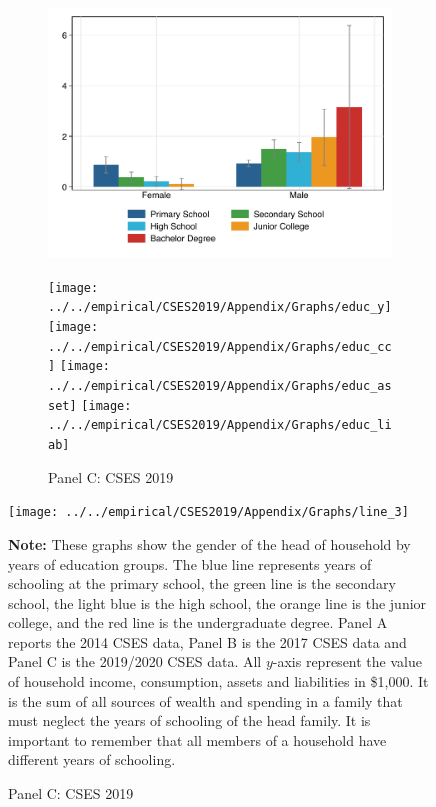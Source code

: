 \documentclass[11pt,letterpaper]{article}
\begin{document}
\begin{figure}[H]
\begin{subfigure}[b]{0.33\linewidth}
		\includegraphics[width=1\linewidth]{../../empirical/CSES2017/Appendix/Graphs/educ_liab} 
		\vspace{-2.5em}
		\newline {}
	\end{subfigure}
	\hfil
	\begin{subfigure}[b]{0.33\linewidth}
		\caption*{Panel C: CSES 2019} \vspace{-.5em}
		\label{fig:3c}
		\texttt{[image: ../../empirical/CSES2019/Appendix/Graphs/educ\_y]}
		\vspace{-2.5em}
		\newline {} 
		\texttt{[image: ../../empirical/CSES2019/Appendix/Graphs/educ\_cc]}
		\vspace{-2.5em}
		\newline {} 
		\texttt{[image: ../../empirical/CSES2019/Appendix/Graphs/educ\_asset]} 
		\vspace{-2.5em}
		\newline {}
		\texttt{[image: ../../empirical/CSES2019/Appendix/Graphs/educ\_liab]} 
		\vspace{-2.5em}
		\newline {}
	\end{subfigure}
		\texttt{[image: ../../empirical/CSES2019/Appendix/Graphs/line\_3]} 
	\begin{tablenotes}
		\footnotesize
		\item \textbf{Note:} These graphs show the gender of the head of household by years of education groups. The blue line represents years of schooling at the primary school, the green line is the secondary school, the light blue is the high school, the orange line is the junior college, and the red line is the undergraduate degree. Panel A reports the 2014 CSES data, Panel B is the 2017 CSES data and Panel C is the 2019/2020 CSES data. All $y$-axis represent the value of household income, consumption, assets and liabilities in \$1,000. It is the sum of all sources of wealth and spending in a family that must neglect the years of schooling of the head family. It is important to remember that all members of a household have different years of schooling. 

\end{tablenotes}
\end{figure}
\end{document}
